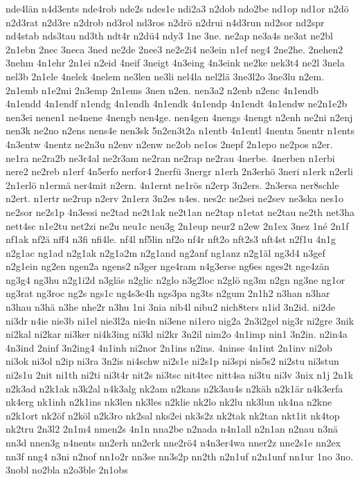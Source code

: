 {nde4län
n4d3ents
nde4rob
nde2s
ndes1e
ndi2a3
n2dob
ndo2be
nd1op
nd1or
n2dö
n2d3rat
n2d3re
n2drob
nd3rol
nd3ros
n2drö
n2drui
n4d3run
nd2sor
nd2spr
nd4stab
nds3tau
nd3th
ndt4r
n2dü4
ndy3
1ne
3ne.
ne2ap
ne3a4s
ne3at
ne2bl
2n1ebn
2nec
3neca
3ned
ne2de
2nee3
ne2e2i4
ne3ein
n1ef
neg4
2ne2he.
2nehen2
3nehm
4n1ehr
2n1ei
n2eid
4neif
3neigt
4n3eing
4n3eink
ne2ke
nek3t4
ne2l
3nela
nel3b
2n1ele
4nelek
4nelem
ne3len
ne3li
nel4la
nel2lä
3ne3l2o
3ne3lu
n2em.
2n1emb
n1e2mi
2n3emp
2n1ems
3nen
n2en.
nen3a2
n2enb
n2enc
4n1endb
4n1endd
4n1endf
n1endg
4n1endh
4n1endk
4n1endp
4n1endt
4n1endw
ne2n1e2b
nen3ei
nenen1
ne4nene
4nengb
nen4ge.
nen4gen
4nengs
4nengt
n2enh
ne2ni
n2enj
nen3k
ne2no
n2ens
nens4e
nen3sk
5n2en3t2a
n1entb
4n1entl
4nentn
5nentr
n1ents
4n3entw
4nentz
ne2n3u
n2env
n2enw
ne2ob
ne1os
2nepf
2n1epo
ne2pos
n2er.
ne1ra
ne2ra2b
ne3r4al
ne2r3am
ne2ran
ne2rap
ne2rau
4nerbe.
4nerben
n1erbi
nere2
ne2reb
n1erf
4n5erfo
nerfor4
2nerfü
3nergr
n1erh
2n3erhö
3neri
n1erk
n2erli
2n1erlö
n1ermä
ner4mit
n2ern.
4n1ernt
ne1rös
n2erp
3n2ers.
2n3ersa
ner8schle
n2ert.
n1ertr
ne2rup
n2erv
2n1erz
3n2es
n4es.
nes2c
ne2sei
ne2sev
ne3ska
nes1o
ne2sor
ne2s1p
4n3essi
ne2tad
ne2t1ak
ne2t1an
ne2tap
n1etat
ne2tau
ne2th
net3ha
nett4sc
n1e2tu
net2zi
ne2u
neu1c
neu3g
2n1eup
neur2
n2ew
2n1ex
3nez
1né
2n1f
nf1ak
nf2ä
nff4
n3fi
nfi4le.
nf4l
nf5lin
nf2o
nf4r
nft2o
nft2s3
nft4st
n2f1u
4n1g
n2g1ac
ng1ad
n2g1ak
n2g1a2m
n2g1and
ng2anf
ng1anz
n2g1äl
ng3d4
n3gef
n2g1ein
ng2en
ngen2a
ngens2
n3ger
nge4ram
n4g3erse
ng6es
nges2t
nge4zän
ng3g4
ng3hu
n2g1i2d
n3gläs
n2glic
n2glo
n3g2loc
n2glö
ng3m
n2gn
ng3ne
ng1or
ng3rat
ng3roc
ng2s
ngs1c
ng4s3e4h
ngs3pa
ng3ts
n2gum
2n1h2
n3han
n3har
n3hau
n3hä
n3he
nhe2r
n3hu
1ni
3nia
nib4l
nibu2
nich8ters
n1id
3n2id.
ni2de
ni3dr
n4ie
nie3b
ni1el
nie3l2a
nie4n
ni3ene
ni1ero
nig2a
2n3i2gel
nig3r
ni2gre
3nik
ni2kal
ni2kar
ni3ker
ni4k3ing
ni3kl
ni2kr
3n2il
nim2o
4n1imp
nin1
3n2in.
n2in4a
4n3ind
2ninf
3n2ing4
4n1inh
ni2nor
2n1ins
n2ins.
4ninse
4n1int
2n1inv
ni2ob
ni3ok
ni3ol
n2ip
ni3ra
3n2is
ni4schw
ni2s1e
ni2s1p
ni3spi
nis5s2
ni2stu
ni3stun
ni2s1u
2nit
ni1th
ni2ti
ni3t4r
nit2s
ni3tsc
nit4tec
nitt4sa
ni3tu
ni3v
3nix
n1j
2n1k
n2k3ad
n2k1ak
n3k2al
n4k3alg
nk2am
n2kans
n2k3au4s
n2käh
n2k1är
n4k3erfa
nk4erg
nk1inh
n2k1ins
nk3len
nk3les
n2klie
nk2lo
nk2lu
nk3lun
nk4na
n2kne
n2k1ort
nk2öf
n2köl
n2k3ro
nk2sal
nks2ei
nk3s2z
nk2tak
nk2tan
nkt1it
nk4top
nk2tru
2n3l2
2n1m4
nmen2s
4n1n
nna2be
n2nada
n4n1all
n2n1an
n2nau
n3nä
nn3d
nnen3g
n4nents
nn2erh
nn2erk
nne2rö4
n4n3er4wa
nner2z
nne2s1e
nn2ex
nn3f
nng4
n3ni
n2nof
nn1o2r
nn3se
nn3s2p
nn2th
n2n1uf
n2n1unf
nn1ur
1no
3no.
3nobl
no2bla
n2o3ble
2n1obs
}
